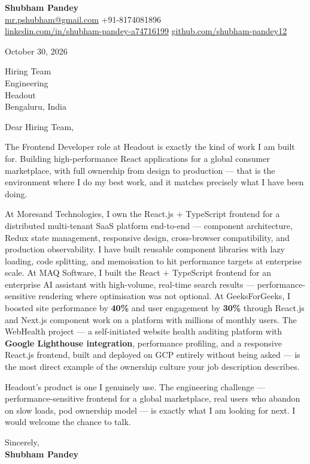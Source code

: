 \documentclass[a4paper,11pt]{article}
\begin{document}
\textbf{\Large Shubham Pandey}\\
\href{mailto:mr.pshubham@gmail.com}{mr.pshubham@gmail.com} \quad +91-8174081896\\
\href{https://www.linkedin.com/in/shubham-pandey-a74716199/}{linkedin.com/in/shubham-pandey-a74716199} \quad
\href{https://github.com/shubham-pandey12}{github.com/shubham-pandey12}

\vspace{1em}
October 30, 2026

\vspace{1em}
Hiring Team\\
Engineering\\
Headout\\
Bengaluru, India

\vspace{1em}
Dear Hiring Team,

The Frontend Developer role at Headout is exactly the kind of work I am built for. Building high-performance React applications for a global consumer marketplace, with full ownership from design to production --- that is the environment where I do my best work, and it matches precisely what I have been doing.

At Moresand Technologies, I own the React.js + TypeScript frontend for a distributed multi-tenant SaaS platform end-to-end --- component architecture, Redux state management, responsive design, cross-browser compatibility, and production observability. I have built reusable component libraries with lazy loading, code splitting, and memoisation to hit performance targets at enterprise scale. At MAQ Software, I built the React + TypeScript frontend for an enterprise AI assistant with high-volume, real-time search results --- performance-sensitive rendering where optimisation was not optional. At GeeksForGeeks, I boosted site performance by \textbf{40\%} and user engagement by \textbf{30\%} through React.js and Next.js component work on a platform with millions of monthly users. The WebHealth project --- a self-initiated website health auditing platform with \textbf{Google Lighthouse integration}, performance profiling, and a responsive React.js frontend, built and deployed on GCP entirely without being asked --- is the most direct example of the ownership culture your job description describes.

Headout's product is one I genuinely use. The engineering challenge --- performance-sensitive frontend for a global marketplace, real users who abandon on slow loads, pod ownership model --- is exactly what I am looking for next. I would welcome the chance to talk.

\vspace{1em}
Sincerely,\\[0.5em]
\textbf{Shubham Pandey}
\end{document}
